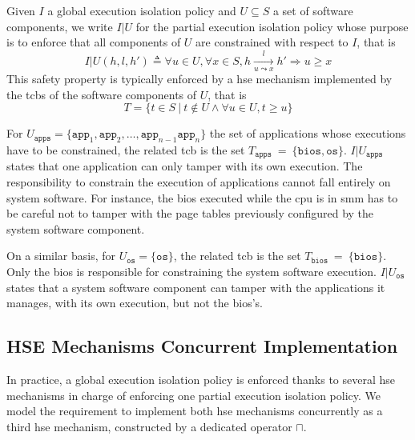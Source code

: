\begin{definition}
  \label{def:speccert:partial}
  Given $I$ a global execution isolation policy and $U \subseteq S$ a set of
  software components, we write $I|U$ for the partial execution isolation
  policy whose purpose is to enforce that all components of $U$ are constrained
  with respect to $I$, that is
  \[
    I|U(h, l, h') \triangleq \forall u \in U, \forall x \in S, h
    \xrightarrow[u \leadsto x]{l} h' \Rightarrow u \ge x
  \]
  This safety property is typically enforced by a \ac{hse} mechanism implemented
  by the \acp{tcb} of the software components of $U$, that is
  \[
    T = \{ t \in S\ |\ t \not\in U \wedge \forall u \in U, t \ge u \}
  \]
\end{definition}

\begin{example}
  For
  $U_{\mathtt{apps}} = \{ \mathtt{app}_1, \mathtt{app}_2, \ldots,
  \mathtt{app}_{n-1} \mathtt{app}_{n} \}$ the set of applications whose
  executions have to be constrained, the related \ac{tcb} is the set
  $T_{\mathtt{apps}}~=~\{ \mathtt{bios}, \mathtt{os} \}$.
  $I|U_{\mathtt{apps}}$ states that one application can only tamper with its
  own execution.
  The responsibility to constrain the execution of applications cannot fall
  entirely on system software.
  For instance, the \ac{bios} executed while the \ac{cpu} is in \ac{smm} has to
  be careful not to tamper with the page tables previously configured by the
  system software component.

  On a similar basis, for $U_{\mathtt{os}} = \{ \mathtt{os} \}$, the related
  \ac{tcb} is the set $T_{\mathtt{bios}}~=~\{ \mathtt{bios} \}$.
  Only the \ac{bios} is responsible for constraining the system software
  execution.
  $I|U_{\mathtt{os}}$ states that a system software component can tamper with the
  applications it manages, with its own execution, but not the \ac{bios}'s.
\end{example}

\subsection{HSE Mechanisms Concurrent Implementation}
\label{subsec:speccert:coop}

In practice, a global execution isolation policy is enforced thanks to several
\ac{hse} mechanisms in charge of enforcing one partial execution isolation
policy.
%
We model the requirement to implement both \ac{hse} mechanisms concurrently as a
third \ac{hse} mechanism, constructed by a dedicated operator $\sqcap$.

